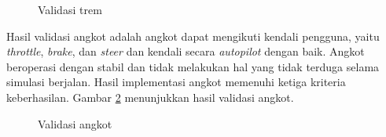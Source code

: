 \begin{figure}[!h]
    \centering
    \hfill
    \caption{Validasi trem}
    \label{fig:tram-validation}
\end{figure}

Hasil validasi angkot adalah angkot dapat mengikuti kendali pengguna, yaitu
\textit{throttle}, \textit{brake}, dan \textit{steer} dan kendali secara
\textit{autopilot} dengan baik. Angkot beroperasi dengan stabil dan tidak
melakukan hal yang tidak terduga selama simulasi berjalan. Hasil implementasi
angkot memenuhi ketiga kriteria keberhasilan. Gambar \ref{fig:angkot-validation}
menunjukkan hasil validasi angkot.

\begin{figure}[!h]
    \centering
    \hfill
    \caption{Validasi angkot}
    \label{fig:angkot-validation}
\end{figure}

